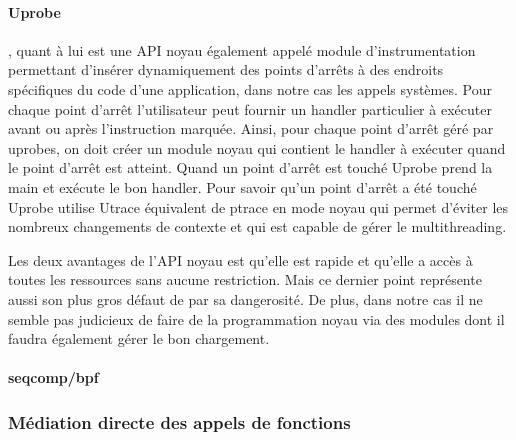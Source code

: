 \paragraph{Uprobe}\cite{INTERCEPTION:AS, INTERCEPTION:MARION},
quant à lui est une API noyau également appelé module d'instrumentation
permettant d'insérer dynamiquement des points d'arrêts à des endroits
spécifiques du code d'une application, dans notre cas les appels systèmes. Pour
chaque point d'arrêt l’utilisateur peut fournir un handler particulier à
exécuter avant ou après l’instruction marquée. Ainsi, pour chaque point d'arrêt
géré par uprobes, on doit créer un module noyau qui contient le handler à
exécuter quand le point d'arrêt est atteint. Quand un point d'arrêt est touché
Uprobe prend la main et exécute le bon handler. Pour savoir qu'un point d'arrêt
a été touché Uprobe utilise Utrace équivalent de ptrace en mode noyau qui permet
d'éviter les nombreux changements de contexte et qui est capable de gérer le
multithreading.

Les deux avantages de l'API noyau est qu'elle est rapide et qu'elle a accès à
toutes les ressources sans aucune restriction. Mais ce dernier point représente
aussi son plus gros défaut de par sa dangerosité. De plus, dans notre cas il ne
semble pas judicieux de faire de la programmation noyau via des modules dont il
faudra également gérer le bon chargement.

\paragraph{seqcomp/bpf}



\subsubsection{Médiation directe des appels de fonctions}
